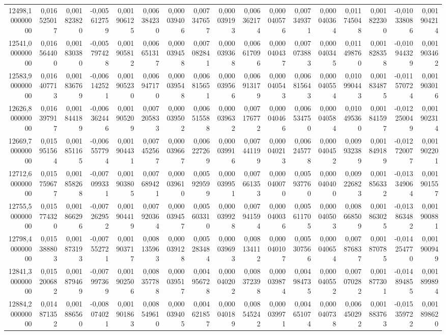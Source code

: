 \begin{longtable}{rrrrrrrrrrrrrrrrr}
12498,100000000 & 0,016525017 & 0,001823820 & -0,005612759 & 0,001906125 & 0,006384230 & 0,000039406 & 0,007347657 & 0,000039193 & 0,006362174 & 0,000040576 & 0,007349371 & 0,000040364 & 0,011745048 & 0,001822300 & -0,010338086 & 0,001904214\\
12541,000000000 & 0,016564400 & 0,001830380 & -0,005797428 & 0,001905812 & 0,006651317 & 0,000039458 & 0,007082841 & 0,000039368 & 0,006617096 & 0,000040437 & 0,007073883 & 0,000040345 & 0,011498760 & 0,001828358 & -0,010944329 & 0,001903462\\
12583,900000000 & 0,016407713 & 0,001836769 & -0,006142521 & 0,001905230 & 0,006947170 & 0,000039548 & 0,006815651 & 0,000039566 & 0,006913179 & 0,000040543 & 0,006815643 & 0,000040554 & 0,010990443 & 0,001834875 & -0,011570724 & 0,001903016\\
12626,800000000 & 0,016397917 & 0,001844189 & -0,006362446 & 0,001905209 & 0,007205833 & 0,000039502 & 0,006515588 & 0,000039632 & 0,007176772 & 0,000040466 & 0,006534750 & 0,000040584 & 0,010495360 & 0,001841597 & -0,012250049 & 0,001902314\\
12669,700000000 & 0,015951564 & 0,001851165 & -0,006557794 & 0,001904431 & 0,007452567 & 0,000039667 & 0,006227269 & 0,000039916 & 0,007441199 & 0,000040213 & 0,006245778 & 0,000040452 & 0,009932389 & 0,001849189 & -0,012720077 & 0,001902201\\
12712,600000000 & 0,015759677 & 0,001858268 & -0,007099331 & 0,001903805 & 0,007689421 & 0,000039610 & 0,005929599 & 0,000039951 & 0,007661353 & 0,000040070 & 0,005937760 & 0,000040400 & 0,009226823 & 0,001856332 & -0,013349064 & 0,001901557\\
12755,500000000 & 0,015774320 & 0,001866296 & -0,007262952 & 0,001904419 & 0,007920364 & 0,000039457 & 0,005603310 & 0,000039928 & 0,007941594 & 0,000040036 & 0,005611705 & 0,000040503 & 0,008668509 & 0,001863025 & -0,013863482 & 0,001900881\\
12798,400000000 & 0,015388803 & 0,001873193 & -0,007552721 & 0,001903717 & 0,008135963 & 0,000039128 & 0,005283484 & 0,000039693 & 0,008134112 & 0,000040107 & 0,005307566 & 0,000040654 & 0,007876837 & 0,001870785 & -0,014254770 & 0,001900949\\
12841,300000000 & 0,015200682 & 0,001879469 & -0,007997369 & 0,001902506 & 0,008357788 & 0,000039517 & 0,004956728 & 0,000040202 & 0,008372398 & 0,000039874 & 0,004984735 & 0,000040552 & 0,007070282 & 0,001877301 & -0,014894855 & 0,001899894\\
12884,200000000 & 0,014871352 & 0,001886560 & -0,008074021 & 0,001901863 & 0,008549610 & 0,000039405 & 0,004621857 & 0,000040189 & 0,008545242 & 0,000039971 & 0,004651074 & 0,000040738 & 0,006450292 & 0,001883763 & -0,015359722 & 0,001898620\\

\end{longtable}
